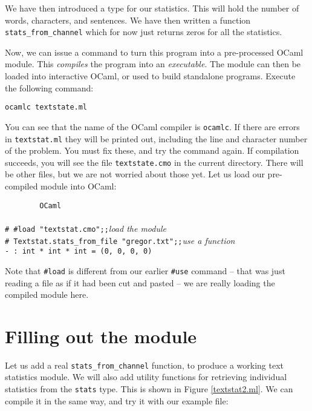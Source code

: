 \documentclass[]{book}
\newcommand{\smspace}{\vspace{4mm}}
\begin{document}
We have then introduced a type for our statistics. This will hold the number of words, characters, and sentences. We have then written a function \texttt{stats\_from\_channel} which for now just returns zeros for all the statistics.

Now, we can issue a command to turn this program into a pre-processed OCaml module. This \textit{compiles} the program into an \textit{executable}. The module can then be loaded into interactive OCaml, or used to build standalone programs. Execute the following command:

\smspace
\texttt{ocamlc textstate.ml}
\smspace

\noindent You can see that the name of the OCaml compiler is \texttt{ocamlc}. If there are errors in \texttt{textstat.ml} they will be printed out, including the line and character number of the problem. You must fix these, and try the command again. If compilation succeeds, you will see the file \texttt{textstate.cmo} in the current directory. There will be other files, but we are not worried about those yet. Let us load our pre-compiled module into OCaml:

\smspace
\noindent\verb!        OCaml!\\
\noindent\\
\noindent\texttt{\# \#load "textstat.cmo";;}\hfill\textit{load the module}\\
\noindent\texttt{\# Textstat.stats\_from\_file "gregor.txt";;}\hfill\textit{use a function}\\
\noindent\texttt{- :\ int * int * int = (0, 0, 0, 0)}\hfill\vphantom{g}
\smspace

\noindent Note that \texttt{\#load} is different from our earlier \texttt{\#use} command -- that was just reading a file as if it had been cut and pasted -- we are really loading the compiled module here.

\section*{Filling out the module}

Let us add a real \texttt{stats\_from\_channel} function, to produce a working text statistics module. We will also add utility functions for retrieving individual statistics from the \texttt{stats} type. This is shown in Figure \ref{textstat2.ml}. We can compile it in the same way, and try it with our example file:
\end{document}
